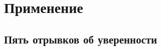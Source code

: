 \documentclass[t,aspectratio=169]{beamer}  %
\begin{document}
\section{Применение}
\subsection{Пять отрывков об уверенности}
\begin{frame}[c]
	\frametitle{\insertsection}
	\framesubtitle{\insertsubsection}
\end{frame}
\end{document}

